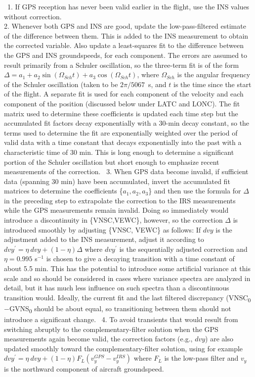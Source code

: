 \documentclass[
]{book}
\begin{document}
~1. If GPS reception has never been valid earlier in the flight, use the INS values without correction.\\
\hspace*{0.333em}2. Whenever both GPS and INS are good, update the low-pass-filtered estimate of the difference between them. This is added to the INS measurement to obtain the corrected variable. Also update a least-squares fit to the difference between the GPS and INS groundspeeds, for each component. The errors are assumed to result primarily from a Schuler oscillation, so the three-term fit is of the form \(\Delta=a_1+a_2\sin(\Omega_{Sch}t)+a_3\cos(\Omega_{Sch}t)\), where \(\Omega_{Sch}\) is the angular frequency of the Schuler oscillation (taken to be \(2\pi/5067\)~s, and \(t\) is the time since the start of the flight. A separate fit is used for each component of the velocity and each component of the position (discussed below under LATC and LONC). The \protect\hypertarget{fit-matrix}{}{fit matrix} used to determine these coefficients is updated each time step but the accumulated fit factors decay exponentially with a 30-min decay constant, so the terms used to determine the fit are exponentially weighted over the period of valid data with a time constant that decays exponentially into the past with a characteristic time of 30 min. This is long enough to determine a significant portion of the Schuler oscillation but short enough to emphasize recent measurements of the correction.
~3. When GPS data become invalid, if sufficient data (spanning 30 min) have been accumulated, invert the accumulated fit matrices to determine the coefficients \{\(a_1,a_2,a_3\)\} and then use the formula for \(\Delta\) in the preceding step to extrapolate the correction to the IRS measurements while the GPS measurements remain invalid. Doing so immediately would introduce a discontinuity in \{VNSC,VEWC\}, however, so the correction \(\Delta\) is introduced smoothly by adjusting \{VNSC, VEWC\} as follows: If \(dvy\) is the adjustment added to the INS measurement, adjust it according to
\(dvy^\prime=\eta\ dvy+(1-\eta)\Delta\) where \(dvy^\prime\) is the sequentially adjusted correction and \(\eta=0.995\) s\(^{-1}\) is chosen to give a decaying transition with a time constant of about 5.5 min. This has the potential to introduce some artificial variance at this scale and so should be considered in cases where variance spectra are analyzed in detail, but it has much less influence on such spectra than a discontinuous transition would. Ideally, the current fit and the last filtered discrepancy (VNSC\textsubscript{0}\(-\)GVNS\textsubscript{0} should be about equal, so transitioning between them should not introduce a significant change.
~4. To avoid transients that would result from switching abruptly to the complementary-filter solution when the GPS measurements again become valid, the correction factors (e.g., \(dvy\)) are also updated smoothly toward the complementary-filter solution, using for example \(dvy^\prime=\eta\ dvy+(1-\eta)F_L(v_y^{GPS}-v_y^{IRS})\) where \(F_L\) is the low-pass filter and \(v_y\) is the northward component of aircraft groundspeed.
\end{document}

